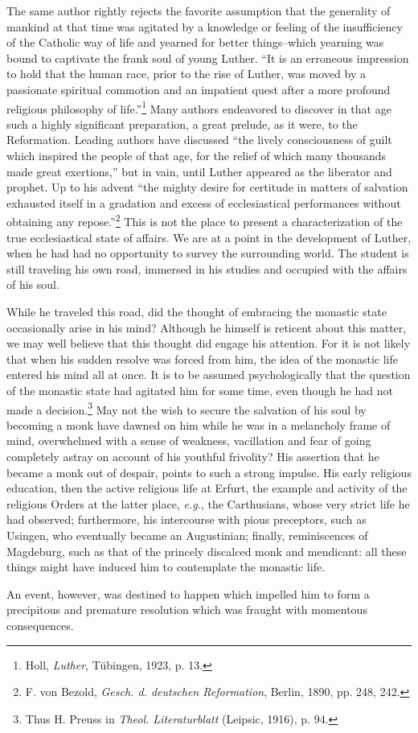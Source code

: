 The same author rightly rejects the favorite assumption that the
generality of mankind at that time was agitated by a knowledge
or feeling of the insufficiency of the Catholic way of life and
yearned for better things--which yearning was bound to captivate the frank soul of young Luther. “It is an erroneous
impression to hold that the human race, prior to the rise of Luther,
was moved by a passionate spiritual commotion and an impatient
quest after a more profound religious philosophy of life.”\footnote{Holl, \textit{Luther}, Tübingen, 1923, p. 13.}
Many authors endeavored to discover in that age such a highly significant
preparation, a great prelude, as it were, to the Reformation. Leading authors have discussed “the lively consciousness of guilt which
inspired the people of that age, for the relief of which many thousands made great exertions,” but in vain, until Luther appeared as the liberator and prophet. Up to his advent “the mighty desire
for certitude in matters of salvation exhausted itself in a gradation
and excess of ecclesiastical performances without obtaining
any repose.”\footnote{F. von Bezold, \textit{Gesch. d. deutschen Reformation}, Berlin, 1890, pp. 248, 242.}
This is not the place to present a characterization
of the true ecclesiastical state of affairs. We are at a point in the
development of Luther, when he had had no opportunity to survey
the surrounding world. The student is still traveling his own road,
immersed in his studies and occupied with the affairs of his soul.

While he traveled this road, did the thought of embracing the
monastic state occasionally arise in his mind? Although he himself
is reticent about this matter, we may well believe that this thought
did engage his attention. For it is not likely that when his sudden
resolve was forced from him, the idea of the monastic life entered
his mind all at once. It is to be assumed psychologically that the
question of the monastic state had agitated him for some time,
even though he had not made a decision.\footnote{Thus H. Preuss in \textit{Theol. Literaturblatt} (Leipsic, 1916), p. 94.}
May not the wish to secure the salvation of his soul by becoming a monk have dawned on
him while he was in a melancholy frame of mind, overwhelmed
with a sense of weakness, vacillation and fear of going completely
astray on account of his youthful frivolity? His assertion that he
became a monk out of despair, points to such a strong impulse. His
early religious education, then the active religious life at Erfurt,
the example and activity of the religious Orders at the latter
place, \textit{e.g.}, the Carthusians, whose very strict life he had observed;
furthermore, his intercourse with pious preceptors, such as Usingen,
who eventually became an Augustinian; finally, reminiscences of
Magdeburg, such as that of the princely discalced monk and mendicant: all these things might have induced him to contemplate the
monastic life.

An event, however, was destined to happen which impelled him to
form a precipitous and premature resolution which was fraught
with momentous consequences.
